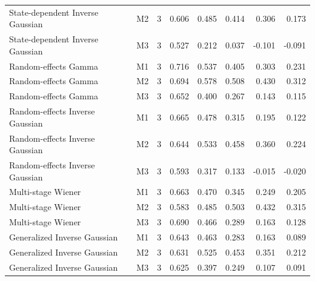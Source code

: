 \begin{table}[t]
\begin{tabular}{lrrrrrrr}
State-dependent Inverse Gaussian & M2 & 3 & 0.606 & 0.485 & 0.414 & 0.306 & 0.173 \\
State-dependent Inverse Gaussian & M3 & 3 & 0.527 & 0.212 & 0.037 & -0.101 & -0.091 \\
Random-effects Gamma & M1 & 3 & 0.716 & 0.537 & 0.405 & 0.303 & 0.231 \\
Random-effects Gamma & M2 & 3 & 0.694 & 0.578 & 0.508 & 0.430 & 0.312 \\
Random-effects Gamma & M3 & 3 & 0.652 & 0.400 & 0.267 & 0.143 & 0.115 \\
Random-effects Inverse Gaussian & M1 & 3 & 0.665 & 0.478 & 0.315 & 0.195 & 0.122 \\
Random-effects Inverse Gaussian & M2 & 3 & 0.644 & 0.533 & 0.458 & 0.360 & 0.224 \\
Random-effects Inverse Gaussian & M3 & 3 & 0.593 & 0.317 & 0.133 & -0.015 & -0.020 \\
Multi-stage Wiener & M1 & 3 & 0.663 & 0.470 & 0.345 & 0.249 & 0.205 \\
Multi-stage Wiener & M2 & 3 & 0.583 & 0.485 & 0.503 & 0.432 & 0.315 \\
Multi-stage Wiener & M3 & 3 & 0.690 & 0.466 & 0.289 & 0.163 & 0.128 \\
Generalized Inverse Gaussian & M1 & 3 & 0.643 & 0.463 & 0.283 & 0.163 & 0.089 \\
Generalized Inverse Gaussian & M2 & 3 & 0.631 & 0.525 & 0.453 & 0.351 & 0.212 \\
Generalized Inverse Gaussian & M3 & 3 & 0.625 & 0.397 & 0.249 & 0.107 & 0.091 \\
\bottomrule
\end{tabular}
\end{table}
